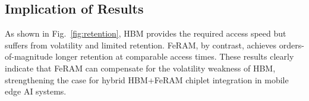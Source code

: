 \subsection{Implication of Results}
As shown in Fig.~\ref{fig:retention}, HBM provides the required access speed but suffers from volatility and limited retention.
FeRAM, by contrast, achieves orders-of-magnitude longer retention at comparable access times.
These results clearly indicate that FeRAM can compensate for the volatility weakness of HBM,
strengthening the case for hybrid HBM+FeRAM chiplet integration in mobile edge AI systems.
